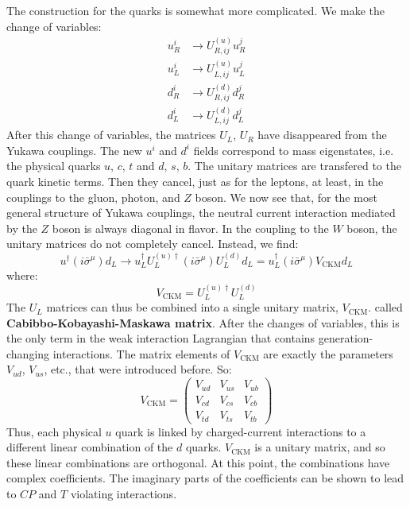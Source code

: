 \documentclass[../../main/main.tex]{subfiles}
\begin{document}
The construction for the quarks is somewhat more complicated. We make the change of variables:
\begin{align}
	u^{i}_{R} &\longrightarrow U^{(u)}_{R,ij} u^{j}_R	\\
	u^{i}_{L} &\longrightarrow U^{(u)}_{L,ij} u^{j}_L	\\
	d^{i}_{R} &\longrightarrow U^{(d)}_{R,ij} d^{j}_R	\\
	d^{i}_{L} &\longrightarrow U^{(d)}_{L,ij} d^{j}_L
\end{align}
After this change of variables, the matrices \( U_L \), \( U_R \) have disappeared from the Yukawa couplings. The new \( u^i \) and \( d^i \) fields correspond to mass eigenstates, i.e. the physical quarks \( u \), \( c \), \( t \) and \( d \), \( s \), \( b \). The unitary matrices are transfered to the quark kinetic terms. Then they cancel, just as for the leptons, at least, in the couplings to the gluon, photon, and \( Z \) boson. We now see that, for the most general structure of Yukawa couplings, the neutral current interaction mediated by the \( Z \) boson is always diagonal in flavor. In the coupling to the \( W \) boson, the unitary matrices do not completely cancel. Instead, we find:
\begin{equation}
	u^{\dag} (i\bar{\sigma}^{\mu}) d_L
	\longrightarrow
	u^{\dag}_L U^{(u)\dag}_L (i\bar{\sigma}^{\mu}) U^{(d)}_L d_L
	=
	u^{\dag}_L (i\bar{\sigma}^{\mu}) V_{\mathrm{CKM}} d_L
	\label{eq:}
\end{equation}
where:
\begin{equation}
	V_{\mathrm{CKM}}
	=
	U^{(u)\dag}_L U^{(d)}_L
	\label{eq:}
\end{equation}
The \( U_L \) matrices can thus be combined into a single unitary matrix, \( V_{\mathrm{CKM}} \). called \textbf{Cabibbo-Kobayashi-Maskawa matrix}. After the changes of variables, this is the only term in the weak interaction Lagrangian that contains generation-changing interactions. The matrix elements of \( V_{\mathrm{CKM}} \) are exactly the parameters \( V_{ud} \), \( V_{us} \), etc., that were introduced before. So:
\begin{equation}
	V_{\mathrm{CKM}}
	=
	\begin{pmatrix}
		V_{ud}	&	V_{us}	&	V_{ub}	\\
		V_{cd}	&	V_{cs}	&	V_{cb}	\\
		V_{td}	&	V_{ts}	&	V_{tb}
	\end{pmatrix}
	\label{eq:}
\end{equation}
Thus, each physical \( u \) quark is linked by charged-current interactions to a different linear combination of the \( d \) quarks. \( V_{\mathrm{CKM}} \) is a unitary matrix, and so these linear combinations are orthogonal. At this point, the combinations have complex coefficients. The imaginary parts of the coefficients can be shown to lead to \( CP \) and \( T \) violating interactions.
\end{document}
